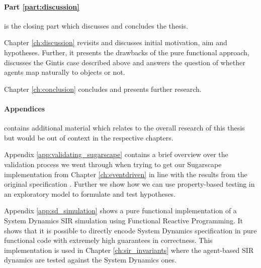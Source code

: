 \medskip

\paragraph{Part \ref{part:discussion}} is the closing part which discusses and concludes the thesis. 
\medskip

Chapter \ref{ch:discussion} revisits and discusses initial motivation, aim and hypotheses. Further, it presents the drawbacks of the pure functional approach, discusses the Gintis case described above and answers the question of whether agents map naturally to objects or not.

\medskip

Chapter \ref{ch:conclusion} concludes and presents further research.

\paragraph{Appendices} contains additional material which relates to the overall research of this thesis but would be out of context in the respective chapters.
\medskip

Appendix \ref{app:validating_sugarscape} contains a brief overview over the validation process we went through when trying to get our Sugarscape implementation from Chapter \ref{ch:eventdriven} in line with the results from the original specification \cite{epstein_growing_1996}. Further we show how we can use property-based testing in an exploratory model to formulate and test hypotheses.

\medskip

Appendix \ref{app:sd_simulation} shows a pure functional implementation of a System Dynamics SIR simulation using Functional Reactive Programming. It shows that it is possible to directly encode System Dynamics specification in pure functional code with extremely high guarantees in correctness. This implementation is used in Chapter \ref{ch:sir_invariants} where the agent-based SIR dynamics are tested against the System Dynamics ones.